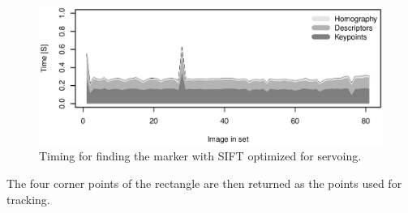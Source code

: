 \begin{figure}[h]
 \centering
 \includegraphics[width=\fullImageWidth]{graphics/marker3_timing_crop}
 \caption{Timing for finding the marker with SIFT optimized for servoing.}
 \label{fig:time_sift_crop}
\end{figure}

The four corner points of the rectangle are then returned as the points used for tracking.
